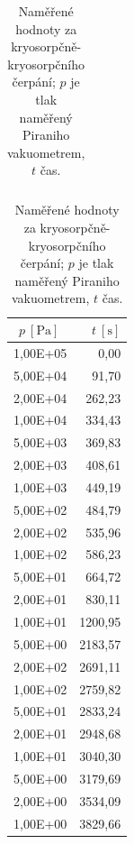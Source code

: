 \documentclass[english]{article}
\newcommand{\unitb}[1]{~\mathrm{[#1]}}
\begin{document}
\begin{table}[h!]
\begin{minipage} [c]{.45\linewidth}
\begin{tabular}{|r|r|}
   \end{tabular}
     \caption{Naměřené hodnoty za rotačně-kryosorpčního čerpání; $p$ je tlak naměřený Piraniho vakuometrem, $t$ čas.} 
     \label{tab:kryorot}
\end{minipage}
\hspace{0.5cm} 
\begin{minipage}[c]{.45\linewidth}
\centering
\begin{tabular}{|r|r|}
\hline
\boldmath{}\textbf{$p\unitb{Pa}$}\unboldmath{}\ & \boldmath{}\textbf{$t\unitb{s}$}\unboldmath{}\\
     \hline
    1,00E+05 & 0,00 \\ \hline
    5,00E+04 & 91,70 \\ \hline
    2,00E+04 & 262,23 \\ \hline
    1,00E+04 & 334,43 \\ \hline
    5,00E+03 & 369,83 \\ \hline
    2,00E+03 & 408,61 \\ \hline
    1,00E+03 & 449,19 \\ \hline
    5,00E+02 & 484,79 \\ \hline
    2,00E+02 & 535,96 \\ \hline
    1,00E+02 & 586,23 \\ \hline
    5,00E+01 & 664,72 \\ \hline
    2,00E+01 & 830,11 \\ \hline
    1,00E+01 & 1200,95 \\ \hline
    5,00E+00 & 2183,57 \\ \hline
    2,00E+02 & 2691,11 \\ \hline
    1,00E+02 & 2759,82 \\ \hline
    5,00E+01 & 2833,24 \\ \hline
    2,00E+01 & 2948,68 \\ \hline
    1,00E+01 & 3040,30 \\ \hline
    5,00E+00 & 3179,69 \\ \hline
    2,00E+00 & 3534,09 \\ \hline
    1,00E+00 & 3829,66 \\ \hline
    
      \end{tabular}
    \caption{Naměřené hodnoty za kryosorpčně-kryosorpčního čerpání; $p$ je tlak naměřený Piraniho vakuometrem, $t$ čas.}
    \label{tab:kryo+kryo}    
\end{minipage}
\end{table}

%	
%	
\end{document}
